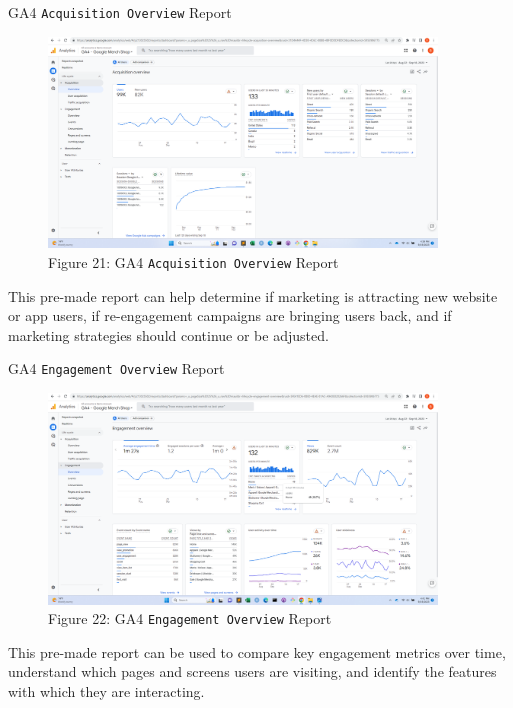 \documentclass[pdf]{beamer}
\theoremstyle{remark}
\theoremstyle{definition}
\begin{document}
\begin{frame}[t]{GA4 \texttt{Acquisition Overview} Report}
\begin{figure}[htbp]
  \captionsetup{justification=centering}
  \includegraphics[height=5.6cm, trim=1.5cm 0.0cm 2.0cm 0.0cm width=5.6cm]{Images/G4A_8a_091923_Acquisition_Overview.png}
  \caption{Figure {\color{franklinblue} 21}: GA4 \texttt{Acquisition Overview} Report}
\end{figure}
\vspace{-2.0ex}
\small 
This pre-made report can help determine if marketing is attracting new website or app users, if re-engagement campaigns are bringing users back, and if marketing strategies should continue or be adjusted.
\end{frame}

\begin{frame}[t]{GA4 \texttt{Engagement Overview} Report}
\begin{figure}[htbp]
  \captionsetup{justification=centering}
  \includegraphics[height=5.6cm, trim=1.5cm 0.0cm 2.0cm 0.0cm width=5.6cm]{Images/G4A_8b_091923_Engagement_Overview.png}
  \caption{Figure {\color{franklinblue} 22}: GA4 \texttt{Engagement Overview} Report}
\end{figure}
\vspace{-2.0ex}
\small 
This pre-made report can be used to compare key engagement metrics over time, understand which pages and screens users are visiting, and identify the features with which they are interacting.
\end{frame}
\end{document}
